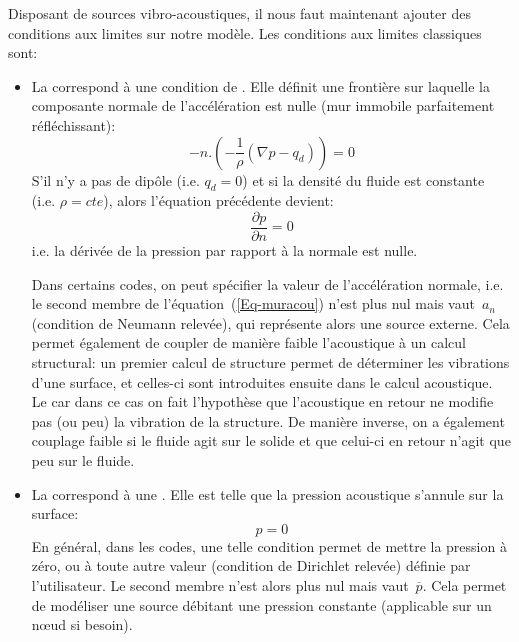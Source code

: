 Disposant de sources vibro-acoustiques, il nous faut maintenant ajouter des conditions aux limites sur notre modèle. Les conditions aux limites classiques sont:
\begin{itemize}
   \item La  correspond à une condition de  . Elle définit une frontière sur laquelle la composante normale de l'accélération est nulle (mur immobile parfaitement réfléchissant):
   \begin{equation}\label{Eq-muracou}
   -n.\left(-\frac1{\rho}(\nabla p-q_d)\right)=0
   \end{equation}
	S'il n'y a pas de dipôle (i.e. $q_d=0$) et si la densité du fluide est constante (i.e. $\rho=cte$), alors l'équation précédente devient:
	\begin{equation}
	\dfrac{\partial p}{\partial n}=0
   \end{equation}	   
   i.e. la dérivée de la pression par rapport à la normale est nulle.
   
   Dans certains codes, on peut spécifier la valeur de l'accélération normale, i.e. le second membre de l'équation~(\ref{Eq-muracou}) n'est plus nul mais vaut~$a_n$ (condition de Neumann relevée), qui représente alors une source externe. Cela permet également de coupler de manière faible l'acoustique à un calcul structural: un premier calcul de structure permet de déterminer les vibrations d'une surface, et celles-ci sont introduites ensuite dans le calcul acoustique. Le  car dans ce cas on fait l'hypothèse que l'acoustique en retour ne modifie pas (ou peu) la vibration de la structure. De manière inverse, on a également couplage faible si le fluide agit sur le solide et que celui-ci en retour n'agit que peu sur le fluide.
   
   \item La  correspond à une . Elle est telle que la pression acoustique s'annule sur la surface:
   \begin{equation}
   p=0
   \end{equation}
   En général, dans les codes, une telle condition permet de mettre la pression à zéro, ou à toute autre valeur (condition de Dirichlet relevée) définie par l'utilisateur. Le second membre n'est alors plus nul mais vaut~$\overline{p}$. Cela permet de modéliser une source débitant une pression constante (applicable sur un nœud si besoin).
   

\end{itemize}
